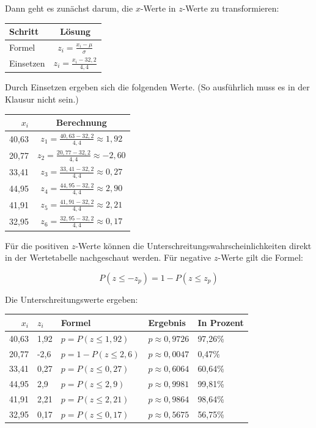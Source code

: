 \documentclass[
  11pt,
  ngerman,
  a4paper,
]{report}
\begin{document}
Dann geht es zunächst darum, die \(x\)-Werte in \(z\)-Werte zu transformieren:

\begin{table}[H]
\centering
\begin{tabular}{lc}
\toprule
Schritt & Lösung\\
\midrule
Formel & $z_{i} = \frac{x_{i} - \mu}{\sigma}$\\
Einsetzen & $z_{i} = \frac{x_{i} - 32{,}2}{4{,}4}$\\
\bottomrule
\end{tabular}
\end{table}

Durch Einsetzen ergeben sich die folgenden Werte. (So ausführlich muss es in der Klausur nicht sein.)

\begin{table}[H]
\centering
\begin{tabular}{rc}
\toprule
$x_i$ & Berechnung\\
\midrule
40,63 & $z_{1}=\frac{40{,}63-32{,}2}{4{,}4}\approx1{,}92$\\
20,77 & $z_{2}=\frac{20{,}77-32{,}2}{4{,}4}\approx-2{,}60$\\
33,41 & $z_{3}=\frac{33{,}41-32{,}2}{4{,}4}\approx0{,}27$\\
44,95 & $z_{4}=\frac{44{,}95-32{,}2}{4{,}4}\approx2{,}90$\\
41,91 & $z_{5}=\frac{41{,}91-32{,}2}{4{,}4}\approx2{,}21$\\
32,95 & $z_{6}=\frac{32{,}95-32{,}2}{4{,}4}\approx0{,}17$\\
\bottomrule
\end{tabular}
\end{table}

Für die positiven \(z\)-Werte können die Unterschreitungs­wahrscheinlichkeiten direkt in der Wertetabelle nachgeschaut werden. Für negative \(z\)-Werte gilt die Formel:

\[ P(z\leq -z_p) = 1-P(z \leq z_p) \]

Die Unterschreitungswerte ergeben:

\begin{table}[H]
\centering
\begin{tabular}{rllll}
\toprule
$x_i$ & $z_i$ & Formel & Ergebnis & In Prozent\\
\midrule
40,63 & 1,92 & $p=P(z \leq 1{,}92)$ & $p \approx 0{,}9726$ & 97,26\%\\
20,77 & -2,6 & $p=1-P(z \leq 2{,}6)$ & $p \approx 0{,}0047$ & 0,47\%\\
33,41 & 0,27 & $p=P(z \leq 0{,}27)$ & $p \approx 0{,}6064$ & 60,64\%\\
44,95 & 2,9 & $p=P(z \leq 2{,}9)$ & $p \approx 0{,}9981$ & 99,81\%\\
41,91 & 2,21 & $p=P(z \leq 2{,}21)$ & $p \approx 0{,}9864$ & 98,64\%\\
32,95 & 0,17 & $p=P(z \leq 0{,}17)$ & $p \approx 0{,}5675$ & 56,75\%\\
\bottomrule
\end{tabular}
\end{table}
\end{document}
